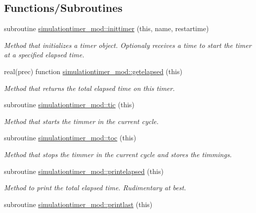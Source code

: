 \subsection*{Functions/\+Subroutines}
\begin{DoxyCompactItemize}
\item 
subroutine \mbox{\hyperlink{namespacesimulationtimer__mod_a3e4c0de31b2db7da6c0c781c047a3743}{simulationtimer\+\_\+mod\+::inittimer}} (this, name, restartime)
\begin{DoxyCompactList}\small\item\em Method that initializes a timer object. Optionaly receives a time to start the timer at a specified elapsed time. \end{DoxyCompactList}\item 
real(prec) function \mbox{\hyperlink{namespacesimulationtimer__mod_a54fa7688c279c747bd76554fb8adb819}{simulationtimer\+\_\+mod\+::getelapsed}} (this)
\begin{DoxyCompactList}\small\item\em Method that returns the total elapsed time on this timer. \end{DoxyCompactList}\item 
subroutine \mbox{\hyperlink{namespacesimulationtimer__mod_a0924f340c4f5785a5981bdc99226e576}{simulationtimer\+\_\+mod\+::tic}} (this)
\begin{DoxyCompactList}\small\item\em Method that starts the timmer in the current cycle. \end{DoxyCompactList}\item 
subroutine \mbox{\hyperlink{namespacesimulationtimer__mod_ae5c4ca42de2cd1f446eee79112cedd14}{simulationtimer\+\_\+mod\+::toc}} (this)
\begin{DoxyCompactList}\small\item\em Method that stops the timmer in the current cycle and stores the timmings. \end{DoxyCompactList}\item 
subroutine \mbox{\hyperlink{namespacesimulationtimer__mod_a9df6f995616d7fa53094178c3aff1fad}{simulationtimer\+\_\+mod\+::printelapsed}} (this)
\begin{DoxyCompactList}\small\item\em Method to print the total elapsed time. Rudimentary at best. \end{DoxyCompactList}\item 
subroutine \mbox{\hyperlink{namespacesimulationtimer__mod_ae6e0d8f98a24587daf93cedb4e93ad79}{simulationtimer\+\_\+mod\+::printlast}} (this)

\end{DoxyCompactItemize}
